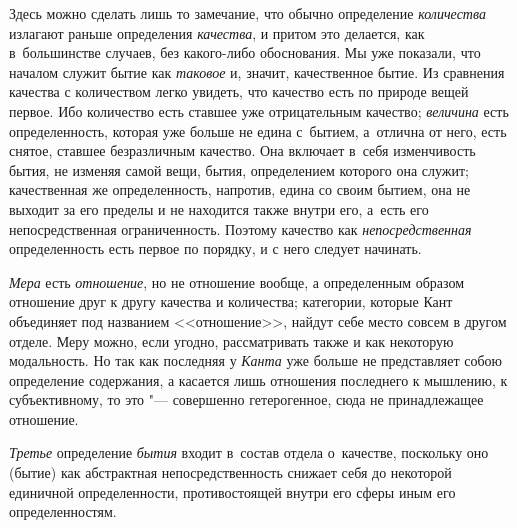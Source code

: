 Здесь можно сделать лишь то замечание, что обычно определение {\em количества}
излагают раньше определения {\em качества}, и притом это делается, как
в~большинстве случаев, без какого-либо обоснования. Мы уже показали, что
началом служит бытие как {\em таковое} и, значит, качественное бытие. Из
сравнения качества с количеством легко увидеть, что качество есть по природе
вещей первое. Ибо количество есть ставшее уже отрицательным качество;
{\em величина} есть определенность, которая уже больше не едина с~бытием,
а~отлична от него, есть снятое, ставшее безразличным качество. Она включает
в~себя изменчивость бытия, не изменяя самой вещи, бытия, определением которого
она служит; качественная же определенность, напротив, едина со своим бытием,
она не выходит за его пределы и не находится также внутри его, а~есть его
непосредственная ограниченность. Поэтому качество как {\em непосредственная}
определенность есть первое по порядку, и с него следует начинать.

{\em Мера} есть {\em отношение}, но не отношение вообще, а определенным образом
отношение друг к другу качества и количества; категории, которые Кант
объединяет под названием <<отношение>>, найдут себе место совсем в другом
отделе. Меру можно, если угодно, рассматривать также и как некоторую
модальность. Но так как последняя у {\em Канта} уже больше не представляет
собою определение содержания, а касается лишь отношения последнего к мышлению,
к субъективному, то это "--- совершенно гетерогенное, сюда не принадлежащее
отношение.

{\em Третье} определение {\em бытия} входит в~состав отдела о~качестве,
поскольку оно (бытие) как абстрактная непосредственность снижает себя до
некоторой единичной определенности, противостоящей внутри его сферы иным
его определенностям.

\bigskip
